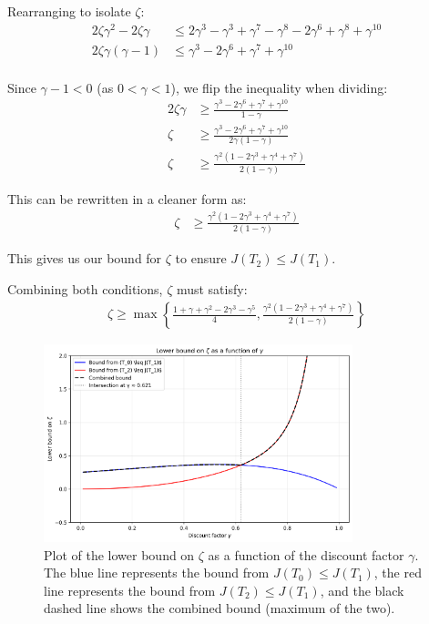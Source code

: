 Rearranging to isolate $\zeta$:
\begin{align}
2\zeta\gamma^2 - 2\zeta\gamma &\leq 2\gamma^3 - \gamma^3 + \gamma^7 - \gamma^8 - 2\gamma^6 + \gamma^8 + \gamma^{10} \\
2\zeta\gamma(\gamma - 1) &\leq \gamma^3 - 2\gamma^6 + \gamma^7 + \gamma^{10} \\
\end{align}

Since $\gamma - 1 < 0$ (as $0 < \gamma < 1$), we flip the inequality when dividing:
\begin{align}
2\zeta\gamma &\geq \frac{\gamma^3 - 2\gamma^6 + \gamma^7 + \gamma^{10}}{1 - \gamma} \\
\zeta &\geq \frac{\gamma^3 - 2\gamma^6 + \gamma^7 + \gamma^{10}}{2\gamma(1 - \gamma)} \\
\zeta &\geq \frac{\gamma^2(1 - 2\gamma^3 + \gamma^4 + \gamma^7)}{2(1 - \gamma)}
\end{align}

This can be rewritten in a cleaner form as:
\begin{align}
\zeta &\geq \frac{\gamma^2(1 - 2\gamma^3 + \gamma^4 + \gamma^7)}{2(1 - \gamma)}
\end{align}

This gives us our bound for $\zeta$ to ensure $J(T_2) \leq J(T_1)$.

Combining both conditions, $\zeta$ must satisfy:
\begin{align}
\zeta \geq \max\left\{\frac{1 + \gamma + \gamma^2 - 2\gamma^3 - \gamma^5}{4}, \frac{\gamma^2(1 - 2\gamma^3 + \gamma^4 + \gamma^7)}{2(1 - \gamma)}\right\}
\end{align}

\begin{figure}[ht]
\centering
\includegraphics[width=0.8\textwidth]{zeta_bound_plot.png}
\caption{Plot of the lower bound on $\zeta$ as a function of the discount factor $\gamma$. The blue line represents the bound from $J(T_0) \leq J(T_1)$, the red line represents the bound from $J(T_2) \leq J(T_1)$, and the black dashed line shows the combined bound (maximum of the two).}
\label{fig:zeta-bound}
\end{figure}

